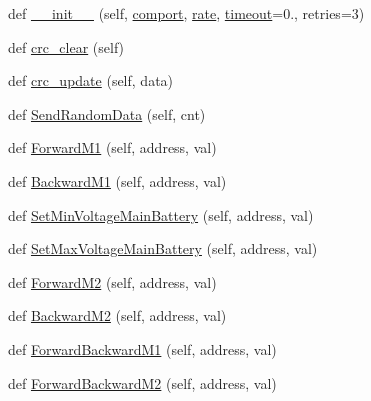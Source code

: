 \begin{DoxyCompactItemize}
\item 
def \mbox{\hyperlink{classtoxic__hardware_1_1roboclaw__3_1_1Roboclaw_a0f9f3612daa4ca7ffa720a9d3b4b3417}{\+\_\+\+\_\+init\+\_\+\+\_\+}} (self, \mbox{\hyperlink{classtoxic__hardware_1_1roboclaw__3_1_1Roboclaw_af11cdc24a14ee681791b216a58a596a9}{comport}}, \mbox{\hyperlink{classtoxic__hardware_1_1roboclaw__3_1_1Roboclaw_a1d580470818c2fa51a0bf3a86bc595bf}{rate}}, \mbox{\hyperlink{classtoxic__hardware_1_1roboclaw__3_1_1Roboclaw_aee145bfca8e9b2eaf3cd3c47157be9a3}{timeout}}=0., retries=3)
\item 
def \mbox{\hyperlink{classtoxic__hardware_1_1roboclaw__3_1_1Roboclaw_a13d25f23765d6d691a12540125b17108}{crc\+\_\+clear}} (self)
\item 
def \mbox{\hyperlink{classtoxic__hardware_1_1roboclaw__3_1_1Roboclaw_ab0194da7d3b1e01752a7d24dee8c7b55}{crc\+\_\+update}} (self, data)
\item 
def \mbox{\hyperlink{classtoxic__hardware_1_1roboclaw__3_1_1Roboclaw_ae99acedd53fe667ff7bed5d38a6859bd}{Send\+Random\+Data}} (self, cnt)
\item 
def \mbox{\hyperlink{classtoxic__hardware_1_1roboclaw__3_1_1Roboclaw_adf9ab5d77d53912be9929f7ed8e6e05f}{Forward\+M1}} (self, address, val)
\item 
def \mbox{\hyperlink{classtoxic__hardware_1_1roboclaw__3_1_1Roboclaw_a33caa5eb9a19e9d3dc648bd1e49cf5ea}{Backward\+M1}} (self, address, val)
\item 
def \mbox{\hyperlink{classtoxic__hardware_1_1roboclaw__3_1_1Roboclaw_a7e011acf85a7b17384719def6997dde8}{Set\+Min\+Voltage\+Main\+Battery}} (self, address, val)
\item 
def \mbox{\hyperlink{classtoxic__hardware_1_1roboclaw__3_1_1Roboclaw_ad2c3c89aa38f0d616778f71128a6ca08}{Set\+Max\+Voltage\+Main\+Battery}} (self, address, val)
\item 
def \mbox{\hyperlink{classtoxic__hardware_1_1roboclaw__3_1_1Roboclaw_abce41d003f6c4583a79616837749db3f}{Forward\+M2}} (self, address, val)
\item 
def \mbox{\hyperlink{classtoxic__hardware_1_1roboclaw__3_1_1Roboclaw_a291d3a943191a562dd0c726430a45c9c}{Backward\+M2}} (self, address, val)
\item 
def \mbox{\hyperlink{classtoxic__hardware_1_1roboclaw__3_1_1Roboclaw_aa2371adb932a68762fe3996c2be8a3ba}{Forward\+Backward\+M1}} (self, address, val)
\item 
def \mbox{\hyperlink{classtoxic__hardware_1_1roboclaw__3_1_1Roboclaw_a72bcc49b759cda4a3de15a6292a28296}{Forward\+Backward\+M2}} (self, address, val)

\end{DoxyCompactItemize}
